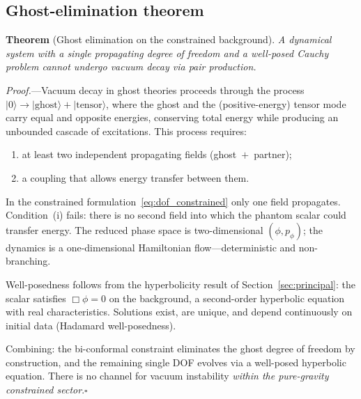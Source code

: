 \documentclass[11pt]{article}
\begin{document}
\subsection{Ghost-elimination theorem}\label{sec:ghost_theorem}

\medskip
\noindent\textbf{Theorem} (Ghost elimination on the constrained background).
\textit{A dynamical system with a single propagating degree of freedom and a well-posed Cauchy problem cannot undergo vacuum decay via pair production.}

\medskip
\noindent\textit{Proof.}---Vacuum decay in ghost theories proceeds through the process $|0\rangle\to|\text{ghost}\rangle+|\text{tensor}\rangle$, where the ghost and the (positive-energy) tensor mode carry equal and opposite energies, conserving total energy while producing an unbounded cascade of excitations.  This process requires:
\begin{enumerate}
\item[(i)] at least two independent propagating fields (ghost~$+$~partner);
\item[(ii)] a coupling that allows energy transfer between them.
\end{enumerate}
In the constrained formulation~\eqref{eq:dof_constrained} only one field propagates.  Condition~(i) fails: there is no second field into which the phantom scalar could transfer energy.  The reduced phase space is two-dimensional $(\phi,p_\phi)$; the dynamics is a one-dimensional Hamiltonian flow---deterministic and non-branching.

Well-posedness follows from the hyperbolicity result of Section~\ref{sec:principal}: the scalar satisfies $\Box\phi=0$ on the background, a second-order hyperbolic equation with real characteristics.  Solutions exist, are unique, and depend continuously on initial data (Hadamard well-posedness).

Combining: the bi-conformal constraint eliminates the ghost degree of freedom by construction, and the remaining single DOF evolves via a well-posed hyperbolic equation.  There is no channel for vacuum instability \emph{within the pure-gravity constrained sector}.\hfill$\square$
\end{document}
